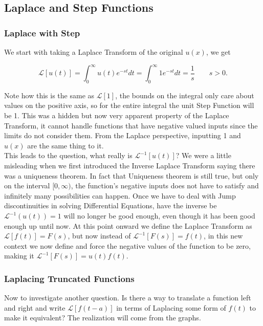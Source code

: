 \documentclass[12pt]{article}
\newcommand{\lp}{\mathscr{L}}
\begin{document}
\subsection{Laplace and Step Functions}

\subsubsection{Laplace with Step}

We start with taking a Laplace Transform of the original $u(x)$, we get

\begin{equation*}
    \lp[u(t)]= \int_0^{\infty} u(t) e^{-st} dt=\int_0^{\infty} 1e^{-st} dt=\frac{1}{s} \qquad s>0.
\end{equation*}

Note how this is the same as $\lp[1]$, the bounds on the integral only care about values on the positive axis, so for the entire integral the unit Step Function will be 1. This was a hidden but now very apparent property of the Laplace Transform, it cannot handle functions that have negative valued inputs since the limits do not consider them. From the Laplace perspective, inputting 1 and $u(x)$ are the same thing to it. \\

This leads to the question, what really is $\lp^{-1}[u(t)]$? We were a little misleading when we first introduced the Inverse Laplace Transform saying there was a uniqueness theorem. In fact that Uniqueness theorem is still true, but only on the interval $[0,\infty)$, the function's negative inputs does not have to satisfy and infinitely many possibilities can happen. Once we have to deal with Jump discontinuities in solving Differential Equations, have the inverse be $\lp^{-1}(u(t))=1$ will no longer be good enough, even though it has been good enough up until now. At this point onward we define the Laplace Transform as $\lp[f(t)]=F(s)$, but now instead of $\lp^{-1}[F(s)]=f(t)$, in this new context we now define and force the negative values of the function to be zero, making it $\lp^{-1}[F(s)]=u(t)f(t)$. \\

\subsubsection{Laplacing Truncated Functions}

Now to investigate another question. Is there a way to translate a function left and right and write $\lp[f(t-a)]$ in terms of Laplacing some form of $f(t)$ to make it equivalent? The realization will come from the graphs.
\end{document}
